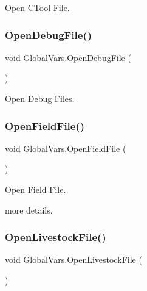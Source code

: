 Open C\+Tool File. 

\mbox{\label{class_global_vars_ae4b87d624a1c79b1cdaca50e96e2275f}} 
\subsubsection{\texorpdfstring{OpenDebugFile()}{OpenDebugFile()}}
{\footnotesize\ttfamily void Global\+Vars.\+Open\+Debug\+File (\begin{DoxyParamCaption}{ }\end{DoxyParamCaption})\hspace{0.3cm}{\ttfamily [inline]}}



Open Debug Files. 

\mbox{\label{class_global_vars_a5eddc5dbbfc855539c90949c67595a0a}} 
\subsubsection{\texorpdfstring{OpenFieldFile()}{OpenFieldFile()}}
{\footnotesize\ttfamily void Global\+Vars.\+Open\+Field\+File (\begin{DoxyParamCaption}{ }\end{DoxyParamCaption})\hspace{0.3cm}{\ttfamily [inline]}}



Open Field File. 

more details. \mbox{\label{class_global_vars_a67d8101f65e6a06b48e4ee6f98648bc1}} 
\subsubsection{\texorpdfstring{OpenLivestockFile()}{OpenLivestockFile()}}
{\footnotesize\ttfamily void Global\+Vars.\+Open\+Livestock\+File (\begin{DoxyParamCaption}{ }\end{DoxyParamCaption})\hspace{0.3cm}{\ttfamily [inline]}}




